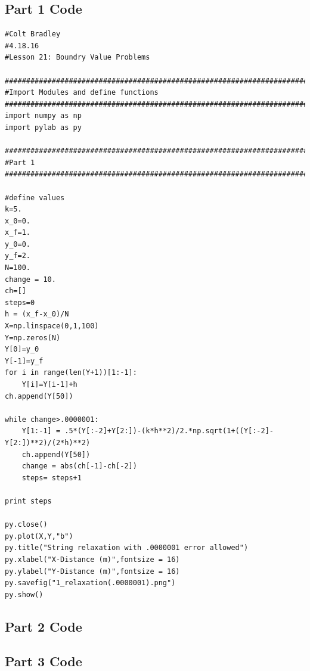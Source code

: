 \documentclass[11pt]{article}
\begin{document}
\subsection{Part 1 Code}
\begin{verbatim}
#Colt Bradley
#4.18.16
#Lesson 21: Boundry Value Problems

###############################################################################
#Import Modules and define functions
###############################################################################
import numpy as np
import pylab as py

###############################################################################
#Part 1
###############################################################################

#define values
k=5.
x_0=0.
x_f=1.
y_0=0.
y_f=2.
N=100.
change = 10.
ch=[]
steps=0
h = (x_f-x_0)/N
X=np.linspace(0,1,100)
Y=np.zeros(N)
Y[0]=y_0
Y[-1]=y_f
for i in range(len(Y+1))[1:-1]:
    Y[i]=Y[i-1]+h
ch.append(Y[50])

while change>.0000001:    
    Y[1:-1] = .5*(Y[:-2]+Y[2:])-(k*h**2)/2.*np.sqrt(1+((Y[:-2]-Y[2:])**2)/(2*h)**2)
    ch.append(Y[50])
    change = abs(ch[-1]-ch[-2])
    steps= steps+1

print steps

py.close()
py.plot(X,Y,"b")
py.title("String relaxation with .0000001 error allowed")
py.xlabel("X-Distance (m)",fontsize = 16)
py.ylabel("Y-Distance (m)",fontsize = 16)
py.savefig("1_relaxation(.0000001).png")
py.show()
\end{verbatim}
\subsection{Part 2 Code}

\subsection{Part 3 Code}
\end{document}
